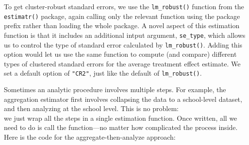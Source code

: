 \documentclass[
]{book}
\newenvironment{Shaded}{\begin{snugshade}}{\end{snugshade}}
\newcommand{\AttributeTok}[1]{\textcolor[rgb]{0.13,0.29,0.53}{#1}}
\newcommand{\ControlFlowTok}[1]{\textcolor[rgb]{0.13,0.29,0.53}{\textbf{#1}}}
\newcommand{\DecValTok}[1]{\textcolor[rgb]{0.00,0.00,0.81}{#1}}
\newcommand{\FunctionTok}[1]{\textcolor[rgb]{0.13,0.29,0.53}{\textbf{#1}}}
\newcommand{\NormalTok}[1]{#1}
\newcommand{\OtherTok}[1]{\textcolor[rgb]{0.56,0.35,0.01}{#1}}
\newcommand{\SpecialCharTok}[1]{\textcolor[rgb]{0.81,0.36,0.00}{\textbf{#1}}}
\newcommand{\StringTok}[1]{\textcolor[rgb]{0.31,0.60,0.02}{#1}}
\begin{document}
\begin{Shaded}
\end{Shaded}

To get cluster-robust standard errors, we use the \texttt{lm\_robust()} function from the \texttt{estimatr()} package, again calling only the relevant function using the package prefix rather than loading the whole package.
A novel aspect of this estimation function is that it includes an additional intput argument, \texttt{se\_type}, which allows us to control the type of standard error calculated by \texttt{lm\_robust()}.
Adding this option would let us use the same function to compute (and compare) different types of clustered standard errors for the average treatment effect estimate.
We set a default option of \texttt{"CR2"}, just like the default of \texttt{lm\_robust()}.

Sometimes an analytic procedure involves multiple steps.
For example, the aggregation estimator first involves collapsing the data to a school-level dataset, and then analyzing at the school level.
This is no problem:\\
we just wrap all the steps in a single estimation function.
Once written, all we need to do is call the function---no matter how complicated the process inside.
Here is the code for the aggregate-then-analyze approach:
\end{document}
